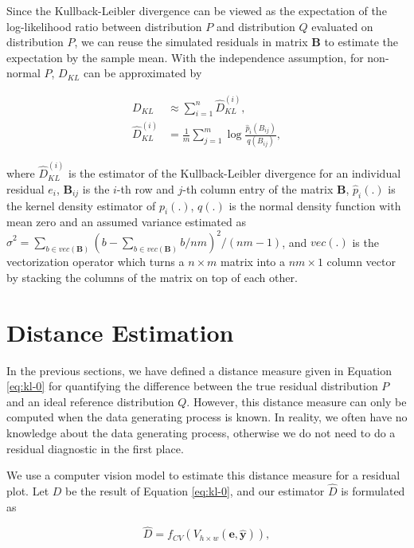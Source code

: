 \documentclass[]{interact}
\theoremstyle{plain}%
\theoremstyle{definition}
\theoremstyle{remark}
\begin{document}
Since the Kullback-Leibler divergence can be viewed as the expectation
of the log-likelihood ratio between distribution \(P\) and distribution
\(Q\) evaluated on distribution \(P\), we can reuse the simulated
residuals in matrix \(\boldsymbol{B}\) to estimate the expectation by
the sample mean. With the independence assumption, for non-normal \(P\),
\(D_{KL}\) can be approximated by

\begin{align*} \label{eq:kl-3}
D_{KL} &\approx \sum_{i = 1}^{n} \hat{D}_{KL}^{(i)}, \\
\hat{D}_{KL}^{(i)} &= \frac{1}{m}\sum_{j = 1}^{m} \log\frac{\hat{p}_i(B_{ij})}{q(B_{ij})},
\end{align*}

\noindent where \(\hat{D}_{KL}^{(i)}\) is the estimator of the
Kullback-Leibler divergence for an individual residual \(e_i\),
\(\boldsymbol{B}_{ij}\) is the \(i\)-th row and \(j\)-th column entry of
the matrix \(\boldsymbol{B}\), \(\hat{p}_i(.)\) is the kernel density
estimator of \(p_i(.)\), \(q(.)\) is the normal density function with
mean zero and an assumed variance estimated as
\(\hat{\sigma}^2 = \sum_{b \in vec(\boldsymbol{B})}(b - \sum_{b \in vec(\boldsymbol{B})} b/nm)^2/(nm - 1)\),
and \(vec(.)\) is the vectorization operator which turns a
\(n \times m\) matrix into a \(nm \times 1\) column vector by stacking
the columns of the matrix on top of each other.

\section{Distance Estimation}\label{sec-model-distance-estimation}

In the previous sections, we have defined a distance measure given in
Equation \ref{eq:kl-0} for quantifying the difference between the true
residual distribution \(P\) and an ideal reference distribution \(Q\).
However, this distance measure can only be computed when the data
generating process is known. In reality, we often have no knowledge
about the data generating process, otherwise we do not need to do a
residual diagnostic in the first place.

We use a computer vision model to estimate this distance measure for a
residual plot. Let \(D\) be the result of Equation \ref{eq:kl-0}, and
our estimator \(\hat{D}\) is formulated as

\begin{equation} \label{eq:d-approx}
\hat{D} = f_{CV}(V_{h \times w}(\boldsymbol{e}, \hat{\boldsymbol{y}})),
\end{equation}
\end{document}
